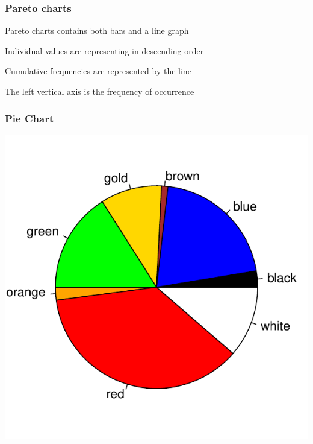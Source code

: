 \documentclass[12pt]{beamer}\usepackage[]{graphicx}\usepackage[]{color}
\newenvironment{knitrout}{}{} %
\begin{document}

\begin{frame}
\frametitle{Pareto charts}
\bbi
  \item Pareto charts contains both bars and a line graph
  \item Individual values are representing in descending order
  \item Cumulative frequencies are represented by the line
  \item The left vertical axis is the frequency of occurrence
\ei
\end{frame}


\begin{frame}
\begin{center}
\Huge{}
\end{center}
\end{frame}


\begin{frame}[fragile]
\frametitle{Pie Chart}

\begin{knitrout}\footnotesize
{}\color{fgcolor}

{\centering \includegraphics[width=.6\linewidth,height=.6\linewidth]{figure/unnamed-chunk-14-1} 

}



\end{knitrout}

\end{frame}
\end{document}
